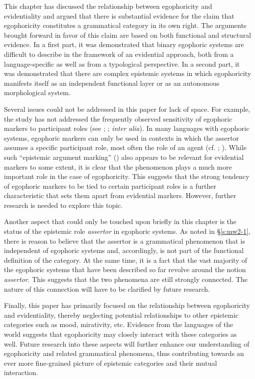 \documentclass[output=paper]{langsci/langscibook}
\begin{document}
This chapter has discussed the relationship between egophoricity and evidentiality and argued that there is substantial evidence for the claim that egophoricity constitutes a grammatical category in its own right. The arguments brought forward in favor of this claim are based on both functional and structural evidence. In a first part, it was demonstrated that binary egophoric systems are difficult to describe in the framework of an evidential approach, both from a language-specific as well as from a typological perspective. In a second part, it was demonstrated that there are complex epistemic systems in which egophoricity manifests itself as an independent functional layer or as an autonomous morphological system. 

Several issues could not be addressed in this paper for lack of space. For example, the study has not addressed the frequently observed sensitivity of egophoric markers to participant roles (see \citealt{Bickel2008}; \citealt{Post2013}; \emph{inter alia}). In many languages with egophoric systems, egophoric markers can only be used in contexts in which the assertor assumes a specific participant role, most often the role of an agent (cf. \citealt{WidmerZemp2017}; \citealt{WidmerZuniga2017}). While such “epistemic argument marking” (\citealt{Bickel2008}) also appears to be relevant for evidential markers to some extent, it is clear that the phenomenon plays a much more important role in the case of egophoricity. This suggests that the strong tendency of egophoric markers to be tied to certain participant roles is a further characteristic that sets them apart from evidential markers. However, further research is needed to explore this topic.

Another aspect that could only be touched upon briefly in this chapter is the status of the epistemic role \emph{assertor} in egophoric systems. As noted in §\ref{s:mw2-1}, there is reason to believe that the assertor is a grammatical phenomenon that is independent of egophoric systems and, accordingly, is not part of the functional definition of the category. At the same time, it is a fact that the vast majority of the egophoric systems that have been described so far revolve around the notion \emph{assertor}. This suggests that the two phenomena are still strongly connected. The nature of this connection will have to be clarified by future research.

Finally, this paper has primarily focused on the relationship between egophoricity and evidentiality, thereby neglecting potential relationships to other epistemic categories such as mood, mirativity, etc. Evidence from the languages of the world suggests that egophoricity may closely interact with these categories as well. Future research into these aspects will further enhance our understanding of egophoricity and related grammatical phenomena, thus contributing towards an ever more fine-grained picture of epistemic categories and their mutual interaction.
 
\end{document}
